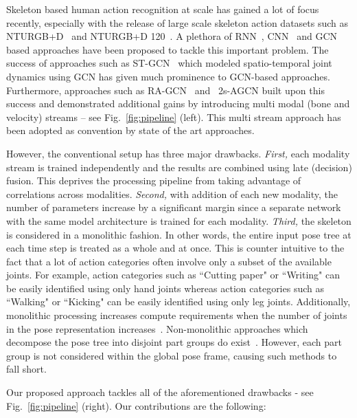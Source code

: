 \documentclass[runningheads]{llncs}
\begin{document}
Skeleton based human action recognition at scale has gained a lot of focus recently, especially with the release of large scale skeleton action datasets such as NTURGB+D~\cite{Shahroudy_2016_CVPR} and NTURGB+D 120~\cite{Liu_2019_NTURGBD120}. A plethora of RNN~\cite{7298714,HAN201785}, CNN~\cite{zhang2019view,HernandezRuiz:2017:CDM:3123266.3123299} and GCN~\cite{stgcn2018aaai,liu2020disentangling} based approaches have been proposed to tackle this important problem. The success of approaches such as ST-GCN~\cite{stgcn2018aaai} which modeled spatio-temporal joint dynamics using GCN has given much prominence to GCN-based approaches. Furthermore, approaches such as RA-GCN~\cite{song2020richly} and ~2s-AGCN\cite{shi2019two} built upon this success and demonstrated additional gains by introducing multi modal (bone and velocity) streams -- see Fig.~\ref{fig:pipeline} (left). This multi stream approach has been adopted as convention by state of the art approaches. 

However, the conventional setup has three major drawbacks. \textit{First,} each modality stream is trained independently and the results are combined using late (decision) fusion. This deprives the processing pipeline from taking advantage of correlations across modalities. \textit{Second,} with addition of each new modality, the number of parameters increase by a significant margin since a separate network with the same model architecture is trained for each modality.
\textit{Third,} the skeleton is considered in a monolithic fashion. In other words,  the entire input pose tree at each time step is treated as a whole and at once. This is counter intuitive to the fact that a lot of action categories often involve only a subset of the available joints. For example, action categories such as ``Cutting paper" or ``Writing" can be easily identified using only hand joints whereas action categories such as ``Walking" or ``Kicking" can be easily identified using only leg joints. Additionally, monolithic processing increases compute requirements when the number of joints in the pose representation increases~\cite{trivedi2021ntux}. Non-monolithic approaches which decompose the pose tree into disjoint part groups do exist~\cite{thakkar2018partbased,song2020stronger}. However, each part group is not considered within the global pose frame, causing such methods to fall short. 

Our proposed approach tackles all of the aforementioned drawbacks - see Fig.~\ref{fig:pipeline} (right). Our contributions are the following:
\end{document}
